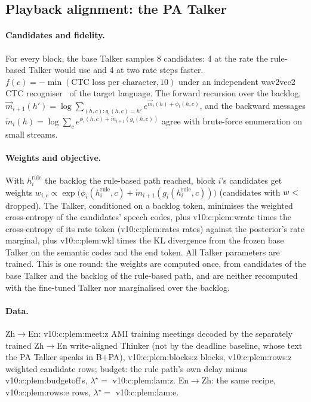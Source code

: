 \subsection{Playback alignment: the PA Talker}
\label{app:plem}

\paragraph{Candidates and fidelity.} For every block, the base Talker samples 8 candidates: 4 at the rate the
rule-based Talker would use and 4 at two rate steps faster. $f(c)=-\min(\text{CTC loss per character},10)$ under an
independent wav2vec2 CTC recogniser~\citep{baevski2020wav2vec} of the target language. The forward recursion over the
backlog, $\overrightarrow{m}_{i+1}(h')=\log\sum_{(h,c):g_i(h,c)=h'}e^{\overrightarrow{m}_i(h)+\phi_i(h,c)}$, and the backward messages
$\overleftarrow{m}_i(h)=\log\sum_c e^{\phi_i(h,c)+\overleftarrow{m}_{i+1}(g_i(h,c))}$ agree with brute-force enumeration on small streams.

\paragraph{Weights and objective.} With $h_i^{\mathrm{rule}}$ the backlog the rule-based path reached, block $i$'s
candidates get weights $w_{i,c}\propto\exp\big(\phi_i(h_i^{\mathrm{rule}},c)+\overleftarrow{m}_{i+1}(g_i(h_i^{\mathrm{rule}},c))\big)$
(candidates with $w<\num{v10:c:plem:minq}$ dropped). The Talker, conditioned on a backlog token, minimises the weighted
cross-entropy of the candidates' speech codes, plus \num{v10:c:plem:wrate} times the cross-entropy of its rate token
(\num{v10:c:plem:rates} rates) against the posterior's rate marginal, plus \num{v10:c:plem:wkl} times the KL divergence
from the frozen base Talker on the semantic codes and the end token. All Talker parameters are trained. This is one
round: the weights are computed once, from candidates of the base Talker and the backlog of the rule-based path, and are
neither recomputed with the fine-tuned Talker nor marginalised over the backlog.

\paragraph{Data.} Zh$\rightarrow$En: \num{v10:c:plem:meet:z} AMI training meetings decoded by the separately trained
Zh$\rightarrow$En write-aligned Thinker (not by the deadline baseline, whose text the PA Talker speaks in B+PA), \num{v10:c:plem:blocks:z} blocks, \num{v10:c:plem:rows:z} weighted candidate rows;
budget: the rule path's own delay minus \num{v10:c:plem:budgetoff}\,s, $\lambda^\star=$ \num{v10:c:plem:lam:z}.
En$\rightarrow$Zh: the same recipe, \num{v10:c:plem:rows:e} rows, $\lambda^\star=$ \num{v10:c:plem:lam:e}.

